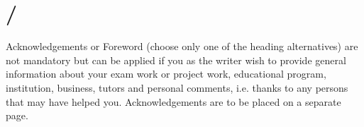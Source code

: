 \section*{/}\label{sec:acknowledgements}
{} 
Acknowledgements or Foreword (choose only one of the heading alternatives) are not mandatory but can
be applied if you as the writer wish to provide general information about your exam work or project
work, educational program, institution, business, tutors and personal comments, i.e. thanks to any
persons that may have helped you. Acknowledgements are to be placed on a separate page.
